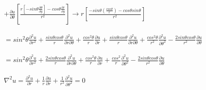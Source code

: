\documentclass[10pt,a4paper]{report}
\begin{document}
\\
\ \\ $\displaystyle
+ \frac{\partial u}{\partial \theta} \left[\frac{r [-sin  \theta \frac{\partial \theta}{\partial y}] - cos \theta \frac{\partial r}{\partial y}}{r^2}\right] \rightarrow r \left[\frac{-sin \theta (\frac{cos \theta}{r}) - cos \theta sin \theta}{r^2}\right]$
\\
\ \\ $\displaystyle
= sin^2 \theta \frac{\partial^2 u}{\partial r^2} + \frac{sin \theta cos \theta}{r} \frac{\partial^2 u}{\partial r \partial \theta} + \frac{cos^2 \theta}{r} \frac{\partial u}{\partial r} + \frac{sin \theta cos \theta}{r} \frac{\partial^2 u}{\partial r \partial \theta} + \frac{cos^2 \theta}{r^2} \frac{\partial^2 u}{\partial \theta^2} - \frac{2 sin \theta cos \theta}{r^2} \frac{\partial u}{\partial \theta}$
\\
\ \\ $\displaystyle
= sin^2 \theta \frac{\partial^2 u}{\partial r^2} + \frac{2 sin \theta cos \theta}{r} \frac{\partial^2 u}{\partial r \partial \theta} + \frac{cos^2 \theta}{r} \frac{\partial u}{\partial r} + \frac{cos^2}{r} \frac{\partial^2 u}{\partial \theta^2} - \frac{2 sin \theta cos \theta}{r^2} \frac{\partial u}{\partial \theta}$
\\
\ \\ $\displaystyle
\nabla^2 u = \frac{\partial^2 u}{\partial r} + \frac{1}{r} \frac{\partial u}{\partial r} + \frac{1}{r^2} \frac{\partial^2 u}{\partial \theta^2} = 0$
\end{document}
